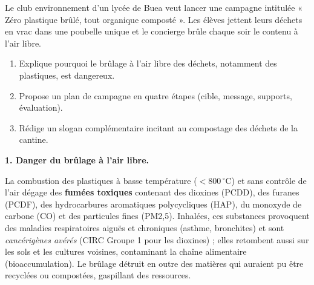 \documentclass[11pt]{article}
\begin{document}
\begin{exoresolu}
Le club environnement d'un lycée de Buea veut lancer une campagne intitulée « Zéro plastique brûlé, tout organique composté ». Les élèves jettent leurs déchets en vrac dans une poubelle unique et le concierge brûle chaque soir le contenu à l'air libre.
\begin{enumerate}
\item Explique pourquoi le brûlage à l'air libre des déchets, notamment des plastiques, est dangereux.
\item Propose un plan de campagne en quatre étapes (cible, message, supports, évaluation).
\item Rédige un slogan complémentaire incitant au compostage des déchets de la cantine.
\end{enumerate}
\tcblower
\textbf{1. Danger du brûlage à l'air libre.}

La combustion des plastiques à basse température ($< 800\,^\circ\mathrm{C}$) et sans contrôle de l'air dégage des \textbf{fumées toxiques} contenant des dioxines (PCDD), des furanes (PCDF), des hydrocarbures aromatiques polycycliques (HAP), du monoxyde de carbone (CO) et des particules fines (PM2,5). Inhalées, ces substances provoquent des maladies respiratoires aiguës et chroniques (asthme, bronchites) et sont \emph{cancérigènes avérés} (CIRC Groupe 1 pour les dioxines) ; elles retombent aussi sur les sols et les cultures voisines, contaminant la chaîne alimentaire (bioaccumulation). Le brûlage détruit en outre des matières qui auraient pu être recyclées ou compostées, gaspillant des ressources.


\end{exoresolu}
\end{document}
